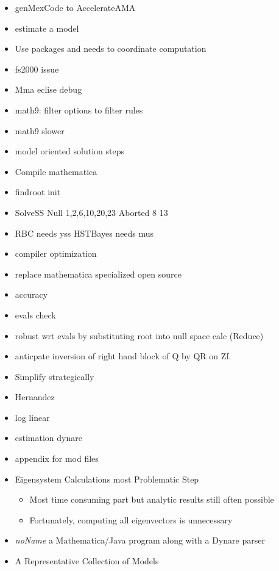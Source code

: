 \documentclass[12pt]{article}
\begin{document}
  \begin{itemize}
  \item genMexCode to AccelerateAMA
  \item estimate a model
  \item Use packages and needs to coordinate computation
  \item fs2000 issue
  \item Mma eclise debug
  \item math9: filter options to filter rules
  \item math9 slower
  \item model oriented solution steps
  \item Compile mathematica
  \item findroot init
  \item SolveSS Null 1,2,6,10,20,23 Aborted 8 13
  \item RBC needs yss HSTBayes needs mus
  \item compiler optimization
  \item replace mathematica specialized open source 
  \item accuracy
  \item evals check
  \item robust wrt evals by substituting root into null space calc (Reduce)
  \item anticpate inversion of right hand block of Q by QR on Zf.
  \item Simplify strategically
  \item Hernandez
  \item log linear
  \item estimation dynare
  \item appendix for mod files
\item Eigensystem Calculations most Problematic Step
  \begin{itemize}
  \item Most time consuming part but analytic results still often possible
  \item Fortunately, computing all eigenvectors is unnecessary
  \end{itemize}
  \item {\em noName} a Mathematica/Java program along with a Dynare parser
  \item  A Representative Collection of Models
  \end{itemize}
\end{document}
